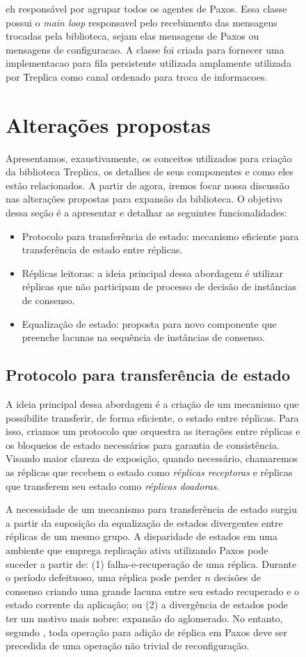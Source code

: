 \begin{figure}[ht]
 eh responsável por agrupar todos os agentes de Paxos.
Essa classe possui o \emph{main loop} responsavel pelo recebimento das mensagens trocadas
pela biblioteca, sejam elas mensagens de Paxos ou mensagens de configuracao. A classe
 foi criada para fornecer uma implementacao para fila
persistente utilizada amplamente utilizada por Treplica como canal ordenado para troca de
informacoes.


\section{Alterações propostas}\label{sec:alteracoes_propostas}

Apresentamos, exaustivamente, os conceitos utilizados para criação da biblioteca Treplica,
os detalhes de seus componentes e como eles estão relacionados. A partir de agora, iremos
focar nossa discussão nas alterações propostas para expansão da biblioteca. O objetivo
dessa seção é a apresentar e detalhar as seguintes funcionalidades:

\begin{itemize}
  \item Protocolo para transferência de estado: mecanismo eficiente para transferência de
    estado entre réplicas.
  \item Réplicas leitoras: a ideia principal dessa abordagem é utilizar réplicas que não
    participam de processo de decisão de instâncias de consenso.
  \item Equalização de estado: proposta para novo componente que preenche lacunas na
    sequência de instâncias de consenso.
\end{itemize}

\subsection{Protocolo para transferência de estado}

A ideia principal dessa abordagem é a criação de um mecanismo que possibilite transferir, de
forma eficiente, o estado entre réplicas. Para isso, criamos um protocolo que orquestra as
iterações entre réplicas e os bloqueios de estado necessários para garantia de
consistência. Visando maior clareza de exposição, quando necessário, chamaremos as
réplicas que recebem o estado como \emph{réplicas receptoras} e réplicas que transferem
seu estado como \emph{réplicas doadoras}.

A necessidade de um mecanismo para transferência de estado surgiu a partir da suposição da
equalização de estados divergentes entre réplicas de um mesmo grupo. A disparidade de
estados em uma ambiente que emprega replicação ativa utilizando Paxos pode suceder a
partir de: (1) falha-e-recuperação de uma réplica. Durante o período defeituoso, uma
réplica pode perder $n$ decisões de consenso criando uma grande lacuna entre seu estado
recuperado e o estado corrente da aplicação; ou (2) a divergência de estados pode ter um
motivo mais nobre: expansão do aglomerado. No entanto, segundo ,
toda operação para adição de réplica em Paxos deve ser precedida de uma operação não
trivial de reconfiguração.


\end{figure}
